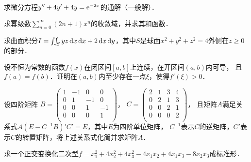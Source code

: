 \documentclass[plain,noanswer,medmath]{../../template/jnuexam}
\begin{document}
        
\begin{problem}
求微分方程$y''+4y'+4y=\mathrm{e}^{-2x}$的通解（一般解）．
\end{problem}



\begin{problem}
求幂级数$\sum_{n=0}^{\infty}(2n+1)x^n$的收敛域，并求其和函数．
\end{problem}



\begin{problem}
求曲面积分$I=\iint_S yz\mathop{}\!\mathrm{d} x\mathop{}\!\mathrm{d} x+2\mathop{}\!\mathrm{d} x\mathop{}\!\mathrm{d} y$，其中$S$是球面$x^2+y^2+z^2=4$外侧在$z\ge 0$的部分．
\end{problem}



\begin{problem}
设不恒为常数的函数$f(x)$在闭区间$[a,b]$上连续，在开区间$(a,b)$内可导，
且$f(a)=f(b)$．证明在$(a,b)$内至少存在一点$\xi$，使得$f'(\xi)>0$．
\end{problem}



\begin{problem}
设四阶矩阵
$B=\begin{pmatrix}
 1 & -1 &  0 &  0 \\
 0 &  1 & -1 &  0 \\
 0 &  0 &  1 & -1 \\
 0 &  0 &  0 &  1 \\
\end{pmatrix}$，
$C=\begin{pmatrix}
 2 & 1 & 3 & 4 \\
 0 & 2 & 1 & 3 \\
 0 & 0 & 2 & 1 \\
 0 & 0 & 0 & 2 \\
\end{pmatrix}$，
且矩阵$A$满足关系式\newline$A(E-C^{-1}B)'C'=E$，其中$E$为四阶单位矩阵，
$C^{-1}$表示$C$的逆矩阵，$C'$表示$C$的转置矩阵，将上述关系式化简并求矩阵$A$．
\end{problem}



\begin{problem}
求一个正交变换化二次型$f=x_1^2+4x_2^2+4x_3^2-4x_1x_2+4x_1x_3-8x_2x_3$成标准形．
\end{problem}


\end{document}
